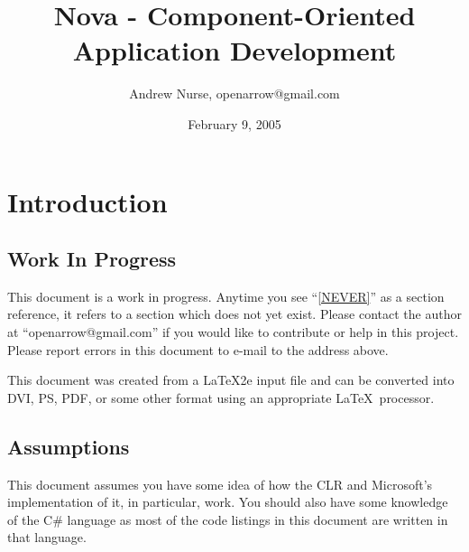 \documentclass[a4paper,12pt]{article}
\begin{document}
\title{Nova - Component-Oriented Application Development}
\author{Andrew Nurse, openarrow@gmail.com}
\date{February 9, 2005}
\maketitle



\section{Introduction}
\label{SEC:Intro}

\subsection{Work In Progress}
\label{SEC:Intro:WIP}
This document is a work in progress. Anytime you see ``\ref{NEVER}'' as a section reference, it refers to a section which does not yet exist. Please contact the author at ``openarrow@gmail.com'' if you would like to contribute or help in this project. Please report errors in this document to e-mail to the address above. 

This document was created from a \LaTeX 2e input file and can be converted into DVI, PS, PDF, or some other format using an appropriate \LaTeX\ processor. 

\subsection{Assumptions}
\label{SEC:Intro:Assumptions}
\label{GLOB:Assumptions}
This document assumes you have some idea of how the CLR and Microsoft's implementation of it, in particular, work. You should also have some knowledge of the C\# language as most of the code listings in this document are written in that language.
\end{document}
